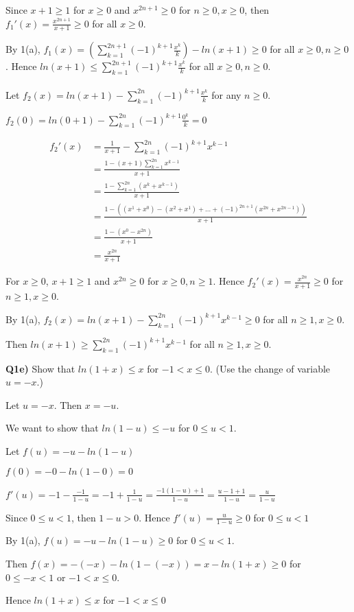 \documentclass[9pt]{article}
\begin{document}
Since $x + 1 \geq 1$ for $x \geq 0$ and $x^{2n + 1} \geq 0$ for $n \geq 0, x \geq 0$, then $f_1'(x) = \frac{x^{2n + 1}}{x + 1} \geq 0$ for all $x \geq 0$.

By 1(a), $f_1(x) = (\sum\limits_{k=1}^{2n+1} (-1)^{k+1} \frac{x^k}{k}) - ln(x + 1) \geq 0$ for all $x \geq 0, n \geq 0$. Hence $ln(x + 1) \leq \sum\limits_{k=1}^{2n+1} (-1)^{k+1} \frac{x^k}{k}$ for all $x \geq 0, n \geq 0$.
\\
\\

Let $f_2(x) = ln(x + 1) - \sum\limits_{k=1}^{2n} (-1)^{k+1} \frac{x^k}{k}$ for any $n \geq 0$.

$f_2(0) = ln(0 + 1) - \sum\limits_{k=1}^{2n} (-1)^{k+1} \frac{0^k}{k} = 0$

\begin{align*}
  f_2'(x) &= \frac{1}{x + 1} - \sum\limits_{k=1}^{2n} (-1)^{k+1} x^{k-1} \\
          &= \frac{1 - (x + 1)\sum\limits_{k=1}^{2n} x^{k - 1}}{x + 1} \\
          &= \frac{1 - \sum\limits_{k=1}^{2n}(x^k + x^{k - 1})}{x + 1} \\
          &= \frac{1 - ((x^1 + x^0) - (x^2 + x^1) + ... + (-1)^{2n + 1}(x^{2n} + x^{2n - 1}))}{x + 1} \\
          &= \frac{1 - (x^0 - x^{2n})}{x + 1} \\
          &= \frac{x^{2n}}{x + 1}
\end{align*}

For $x \geq 0$, $x + 1 \geq 1$ and $x^{2n} \geq 0$ for $x \geq 0, n \geq 1$. Hence $f_2'(x) = \frac{x^{2n}}{x + 1} \geq 0$ for $n \geq 1, x \geq 0$.

By 1(a), $f_2(x) = ln(x + 1) - \sum\limits_{k=1}^{2n} (-1)^{k+1} x^{k-1} \geq 0$ for all $n \geq 1, x \geq 0$.

Then $ln(x + 1) \geq \sum\limits_{k=1}^{2n} (-1)^{k+1} x^{k-1}$ for all $n \geq 1, x \geq 0$.


\begin{tcolorbox}
  \textbf{Q1e)} Show that $ln(1 + x) \leq x$ for $-1 < x \leq 0$. (Use the change of variable $u = -x$.)
\end{tcolorbox}

Let $u = -x$. Then $x = -u$.

We want to show that $ln(1 - u) \leq -u$ for $0 \leq u < 1$.

Let $f(u) = -u - ln(1 - u)$

$f(0) = -0 - ln(1 - 0) = 0$

$f'(u) = -1 - \frac{-1}{1 - u} = -1 + \frac{1}{1-u} = \frac{-1(1-u) + 1}{1 - u} = \frac{u - 1 + 1}{1 - u} = \frac{u}{1 - u}$

Since $0 \leq u < 1$, then $1 - u > 0$. Hence $f'(u) = \frac{u}{1 - u} \geq 0$ for $0 \leq u < 1$

By 1(a), $f(u) = -u - ln(1 - u) \geq 0$ for $0 \leq u < 1$.

Then $f(x) = -(-x) - ln(1 - (-x)) = x - ln(1 + x) \geq 0$ for $0 \leq -x < 1$ or $-1 < x \leq 0$.

Hence $ln(1 + x) \leq x$ for $-1 < x \leq 0$
\end{document}
